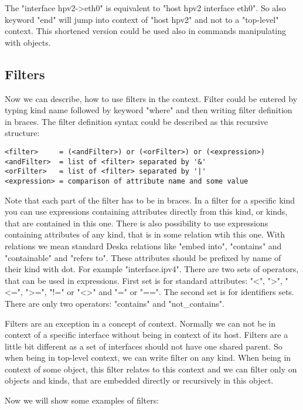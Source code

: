 \documentclass[deska]{subfiles}
\begin{document}
The "interface hpv2->eth0" is equivalent to "host hpv2 interface eth0". So also keyword "end" will jump into context of
"host hpv2" and not to a "top-level" context. This shortened version could be used also in commands manipulating with
objects.

\subsection{Filters}

Now we can describe, how to use filters in the context. Filter could be entered by typing kind name followed by keyword
"where" and then writing filter definition in braces. The filter definition syntax could be described as this recursive
structure:

\begin{verbatim}
<filter>     = (<andFilter>) or (<orFilter>) or (<expression>)
<andFilter>  = list of <filter> separated by '&'
<orFilter>   = list of <filter> separated by '|'
<expression> = comparison of attribute name and some value
\end{verbatim}

Note that each part of the filter has to be in braces. In a filter for a specific kind you can use expressions containing
attributes directly from this kind, or kinds, that are contained in this one. There is also possibility to use expressions
containing attributes of any kind, that is in some relation wtih this one. With relations we mean standard Deska relations
like "embed into", "contains" and "containable" and "refers to". These attributes should be prefixed by name of their
kind with dot. For example "interface.ipv4". There are two sets of operators, that can be used in expressions. First
set is for standard attributes: "<", ">", "<=", ">=", "!=" or "<>" and "=" or "==". The second set is for identifiers
sets. There are only two operators: "contains" and "not\_contains".

Filters are an exception in a concept of context. Normally we can not be in context of a specific interface without being
in context of its host. Filters are a little bit different as a set of interfaces should not have one shared parent. So
when being in top-level context, we can write filter on any kind. When being in context of some object, this filter
relates to this context and we can filter only on objects and kinds, that are embedded directly or recursively in this object.

Now we will show some examples of filters:
\end{document}
